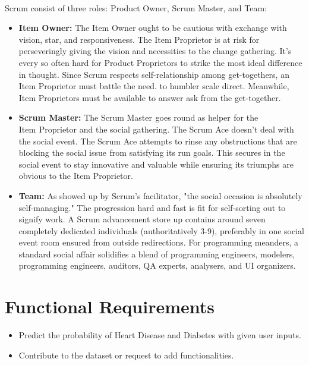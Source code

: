 \documentclass[oneside,12pt]{Classes/VTU}
\begin{document}
		\paragraph{}
    	Scrum consist of three roles: Product Owner, Scrum Master, and Team:
    	\begin{itemize}
    		\item \textbf{Item Owner:} The Item Owner ought to be cautious with exchange with vision, star, and responsiveness. The Item Proprietor is at risk for perseveringly giving the vision and necessities to the change gathering. It's every so often hard for Product Proprietors to strike the most ideal difference in thought. Since Scrum respects self-relationship among get-togethers, an Item Proprietor must battle the need. to humbler scale direct. Meanwhile, Item Proprietors must be available to answer ask from the get-together.
    		
    		\item \textbf{Scrum Master:} The Scrum Master\tiny\textcolor{white}{s}\normalsize goes round as helper\tiny\textcolor{white}{s}\normalsize for the Item\tiny\textcolor{white}{s}\normalsize Proprietor and the social gathering. The Scrum Ace doesn't deal with the social event. The Scrum Ace attempts to rinse any obstructions that are blocking the social issue\tiny\textcolor{white}{s}\normalsize from satisfying its run goals. This secures in the social event to stay innovative and valuable while ensuring its triumphs are obvious to the Item Proprietor.
    		
    		\item \textbf{Team:} As showed up by Scrum's facilitator, "the social occasion is absolutely self-managing." The progression hard and fast is fit for self-sorting out to signify work. A Scrum advancement store up contains around seven completely dedicated individuals (authoritatively 3-9), preferably in one social event room ensured from outside redirections. For programming meanders, a standard social affair solidifies a blend of programming engineers, modelers, programming engineers, auditors, QA experts, analysers, and UI organizers.
    	\end{itemize}
    	
    	
    	\section{Functional Requirements}
    	\begin{itemize}
    		\item Predict the probability of Heart Disease and Diabetes with given user inputs.
    		\item Contribute to the dataset or request to add functionalities.
    	\end{itemize}
    
\end{document}
